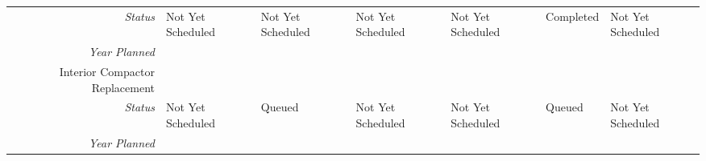 \begin{tabularx}{\textwidth}{r|X|X|X|X|X|X|}
    \multicolumn{1}{|r|}{\cellcolor{ccorangelight}\textit{Status}}                & Not Yet Scheduled                                                         & Not Yet Scheduled                                                         & Not Yet Scheduled                                                         & Not Yet Scheduled                                                         & Completed                                                         & Not Yet Scheduled                                                         \\
    \multicolumn{1}{|r|}{\cellcolor{ccorangelight}\textit{Year Planned}}                  &                                                      &                                                      &                                                      &                                                      &                                                      &                                                      \\ \hline
\multicolumn{1}{|V{.2\columnwidth}|}{\cellcolor{ccorangelight}Interior Compactor Replacement}          &                                                                  &                                                                  &                                                                  &                                                                  &                                                                  &                                                                  \\
    \multicolumn{1}{|r|}{\cellcolor{ccorangelight}\textit{Status}}                & Not Yet Scheduled                                                         & Queued                                                         & Not Yet Scheduled                                                         & Not Yet Scheduled                                                         & Queued                                                         & Not Yet Scheduled                                                         \\
    \multicolumn{1}{|r|}{\cellcolor{ccorangelight}\textit{Year Planned}}                  &                                                      &                                                      &                                                      &                                                      &                                                      &                                                      \\ \hline

\end{tabularx}
